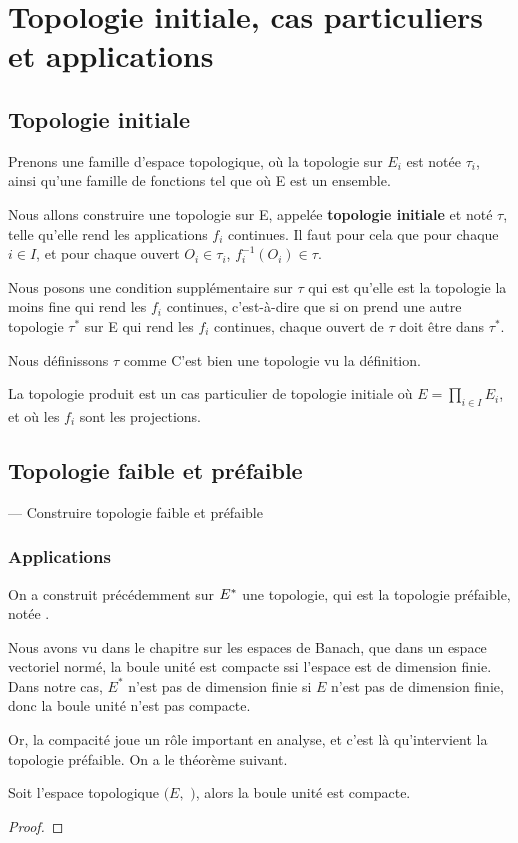 \chapter{Topologie initiale, cas particuliers et applications}

\section{Topologie initiale}

Prenons une famille
 d'espace topologique, où la topologie sur $E_{i}$ est notée
$\tau_{i}$, ainsi qu'une famille de fonctions  tel que
 où E est un ensemble.

Nous allons construire une topologie sur E, appelée \textbf{topologie initiale}
et noté $\tau$, telle qu'elle rend les applications $f_{i}$ continues. Il faut pour cela que
pour chaque $i \in I$, et pour chaque ouvert $O_{i} \in \tau_{i}$,
$f_{i}^{-1}(O_{i}) \in \tau$.

Nous posons une condition supplémentaire sur $\tau$ qui est qu'elle est la
topologie la moins fine qui rend les $f_{i}$ continues, c'est-à-dire que si on
prend une autre topologie $\tau^{*}$ sur E qui rend les $f_{i}$ continues, chaque
ouvert de $\tau$ doit être dans $\tau^{*}$.

Nous définissons $\tau$ comme %
C'est bien une topologie vu la définition.

\begin{exemple}
	La topologie produit est un cas particulier de topologie initiale où $E =
	\displaystyle \prod_{i \in I} E_{i}$, et où les $f_{i}$ sont les projections.
\end{exemple}

\section{Topologie faible et préfaible}

--- Construire topologie faible et préfaible
\subsection{Applications}

On a construit précédemment sur $E^{*}$ une topologie, qui est la topologie
préfaible, notée .

Nous avons vu dans le chapitre sur les espaces de Banach, que dans un espace
vectoriel normé, la boule unité est compacte ssi l'espace est de dimension
finie. Dans notre cas, $E^{*}$ n'est pas de dimension finie si $E$ n'est pas de
dimension finie, donc la boule unité n'est pas compacte.

Or, la compacité joue un rôle important en analyse, et c'est là qu'intervient la topologie préfaible. On a le théorème suivant.

\begin{theorem}
	Soit l'espace topologique $(E,$ $)$, alors la boule unité
	est compacte.
\end{theorem}

\begin{proof}
	
\end{proof}
